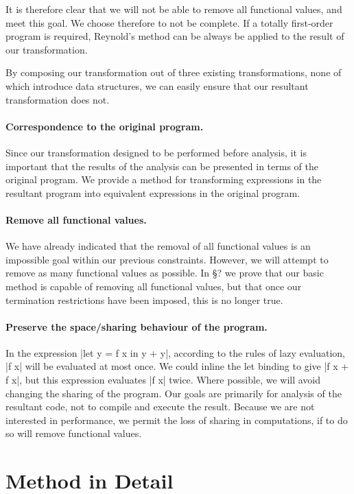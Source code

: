 \documentclass[preprint]{sigplanconf}
\begin{document}
It is therefore clear that we will not be able to remove all functional values, and meet this goal. We choose therefore to not be complete. If a totally first-order program is required, Reynold's method can be always be applied to the result of our transformation.

By composing our transformation out of three existing transformations, none of which introduce data structures, we can easily ensure that our resultant transformation does not.

\paragraph{Correspondence to the original program.} Since our transformation designed to be performed before analysis, it is important that the results of the analysis can be presented in terms of the original program. We provide a method for transforming expressions in the resultant program into equivalent expressions in the original program.

\paragraph{Remove all functional values.} We have already indicated that the removal of all functional values is an impossible goal within our previous constraints. However, we will attempt to remove as many functional values as possible. In \S? we prove that our basic method is capable of removing all functional values, but that once our termination restrictions have been imposed, this is no longer true.

\paragraph{Preserve the space/sharing behaviour of the program.} In the expression |let y = f x in y + y|, according to the rules of lazy evaluation, |f x| will be evaluated at most once. We could inline the let binding to give |f x + f x|, but this expression evaluates |f x| twice. Where possible, we will avoid changing the sharing of the program. Our goals are primarily for analysis of the resultant code, not to compile and execute the result. Because we are not interested in performance, we permit the loss of sharing in computations, if to do so will remove functional values.

\section{Method in Detail}
\end{document}
